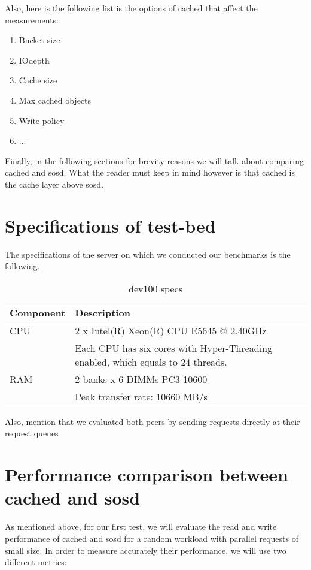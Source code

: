 Also, here is the following list is the options of cached that affect the 
measurements: 

\begin{enumerate}
	\item Bucket size
	\item IOdepth
	\item Cache size
	\item Max cached objects
	\item Write policy
	\item ...
\end{enumerate}

Finally, in the following sections for brevity reasons we will talk about 
comparing cached and sosd. What the reader must keep in mind however is that 
cached is the cache layer above sosd.  

\section{Specifications of test-bed}

The specifications of the server on which we conducted our benchmarks is the 
following.

\begin{table}[H]
	\centering
	\begin{tabular}{ | l | l | }
		\hline
		Component & Description \\ \hline \hline
		CPU &  2 x Intel(R) Xeon(R) CPU E5645 @ 2.40GHz \cite{e5645} \\
		 & Each CPU has six cores with Hyper-Threading enabled, which equals to 
		 24 threads. \\ \hline
		RAΜ & 2 banks x 6 DIMMs PC3-10600 \\
		& Peak transfer rate: 10660 MB/s \\ \hline
	\end{tabular}
	\caption{dev100 specs}
	\label{tab:specs}
\end{table}

Also, mention that we evaluated both peers by sending requests directly at 
their request queues

\section{Performance comparison between cached and sosd}

As mentioned above, for our first test, we will evaluate the read and write 
performance of cached and sosd for a random workload with parallel requests of 
small size. In order to measure accurately their performance, we will use two 
different metrics:

